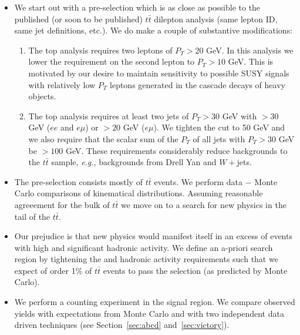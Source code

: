 \begin{itemize}

\item We start out with a pre-selection which is as close as 
possible to the published (or soon to be published) $t\bar{t}$
dilepton analysis\cite{ref:top} (same lepton ID, same jet definitions,
etc.).  We do make a couple of substantive modifications:

\begin{enumerate}
\item The top analysis requires two leptons of $P_T > 20$ GeV.  
 In this
analysis we lower the requirement on the second lepton to $P_T > 10$ 
GeV.  This is motivated by our desire to maintain sensitivity to possible
SUSY signals with relatively low $P_T$ leptons generated in the 
cascade decays of heavy objects.
\item The top analysis requires at least two jets of $P_T > 30$
GeV with \met $>30$ GeV ($ee$ and $e\mu$) or \met $>20$ GeV ($e \mu$).
We tighten the \met cut to 50 GeV and we 
also require that the scalar sum of the $P_T$ of all jets with $P_T > 30$
GeV be $> 100$ GeV.  These requirements considerably
reduce backgrounds to the $t\bar{t}$ sample, {\em e.g.}, backgrounds
from Drell Yan and $W+$jets.
\end{enumerate}

\item The pre-selection consists mostly of $t\bar{t}$ events.  We perform 
data $-$ Monte Carlo comparisons of kinematical distributions.  Assuming
reasonable agreeement for the bulk of $t\bar{t}$ we move on to a 
search for new physics in the tail of the $t\bar{t}$.

\item Our prejudice is that new physics would manifest itself in an
excess of events with high \met and significant hadronic activity.
We define an a-priori search region by tightening the \met and 
hadronic activity requirements such that we expect of order 1\% 
of $t\bar{t}$ events to pass the selection (as predicted by Monte Carlo).

\item We perform a counting experiment in the signal region.  We compare
observed yields with expectations from Monte Carlo and with two independent
data driven techniques (see Section~\ref{sec:abcd} and~\ref{sec:victory}).

\end{itemize}



